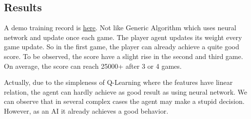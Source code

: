 \documentclass[final]{cvpr}
\begin{document}
\subsection{Results}
A demo training record is \href{qlearning.mp4}{here}.
Not like Generic Algorithm which uses neural network and update once each game.
The player agent updates its weight every game update.
So in the first game, the player can already achieve a quite good score.
To be observed, the score have a slight rise in the second and third game.
On average, the score can reach 25000+ after 3 or 4 games.

Actually, due to the simpleness of Q-Learning where the features have linear relation, 
the agent can hardly achieve as good result as using neural network.
We can observe that in several complex cases the agent may make a stupid decision.
However, as an AI it already achieves a good behavior.



{\small


}
\end{document}
